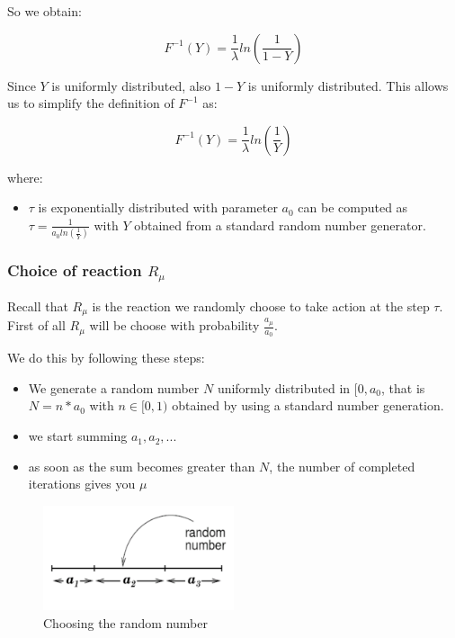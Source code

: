 So we obtain:

\begin{equation*}
    F^{-1}(Y) = \frac{1}{\lambda}ln( \frac{1}{1 - Y})
\end{equation*}

Since $Y$ is uniformly distributed, also $1 - Y$ is uniformly distributed. This allows us to simplify the definition of $F^{-1}$ as:

\begin{equation*}
    F^{-1}(Y) = \frac{1}{\lambda}ln( \frac{1}{Y})
\end{equation*}

where:

\begin{itemize}
    \item $\tau$ is exponentially distributed with parameter $a_{0}$ can be computed as $\tau = \frac{1}{a_{0} ln ( \frac{1}{Y})}$ with $Y$ obtained from a standard random number generator.
\end{itemize}

\subsubsection{Choice of reaction $R_{\mu}$}
Recall that $R_\mu$ is the reaction we randomly choose to take action at the step $\tau$. First of all $R_\mu$ will be choose with probability $\frac{a_{\mu}}{a_{0}}$.\par
We do this by following these steps:
\begin{itemize}
    \item We generate a random number $N$ uniformly distributed in $[0, a_{0}$, that is $N = n * a_{0}$ with $n \in [0,1)$ obtained by using a standard number generation.
    \item we start summing $a_{1}, a_{2}, ...$
    \item as soon as the sum becomes greater than $N$, the number of completed iterations gives you $\mu$
\end{itemize}

\begin{figure}[h]
    \centering
    \includegraphics[width=0.5\textwidth]{Images/06 - Stochastic Simulation of Chemical Reactions/Random_Number.png}
    \caption{Choosing the random number} 
\end{figure}

